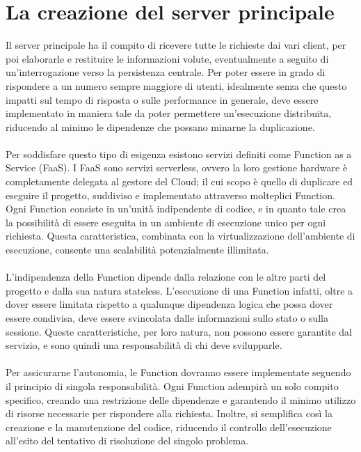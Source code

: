 \section{La creazione del server principale}

Il server principale ha il compito di ricevere tutte le richieste dai vari client,
per poi elaborarle e restituire le informazioni volute,
eventualmente a seguito di un'interrogazione verso la persistenza centrale.
Per poter essere in grado di rispondere a un numero sempre maggiore di utenti,
idealmente senza che questo impatti sul tempo di risposta o sulle performance in generale,
deve essere implementato in maniera tale da poter permettere un'esecuzione distribuita,
riducendo al minimo le dipendenze che possano minarne la duplicazione.\\
\\
Per soddisfare questo tipo di esigenza
esistono servizi definiti come Function as a Service (FaaS).
I FaaS sono servizi serverless,
ovvero la loro gestione hardware è completamente delegata al gestore del Cloud;
il cui scopo è quello di duplicare ed eseguire il progetto,
suddiviso e implementato attraverso molteplici Function.
Ogni Function consiste in un'unità indipendente di codice,
e in quanto tale crea la possibilità di essere eseguita in un ambiente di esecuzione unico per ogni richiesta.
Questa caratteristica, combinata con la virtualizzazione dell’ambiente di esecuzione,
consente una scalabilità potenzialmente illimitata.\\
\\
L’indipendenza della Function dipende dalla relazione con le altre parti del progetto e
dalla sua natura stateless.
L'esecuzione di una Function infatti,
oltre a dover essere limitata rispetto a qualunque dipendenza logica che possa dover essere condivisa,
deve essere svincolata dalle informazioni sullo stato o sulla sessione.
Queste caratteristiche, per loro natura, non possono essere garantite dal servizio,
e sono quindi una responsabilità di chi deve svilupparle.\\
\\
Per assicurarne l'autonomia,
le Function dovranno essere implementate seguendo il principio di singola responsabilità.
Ogni Function adempirà un solo compito specifico,
creando una restrizione delle dipendenze e
garantendo il minimo utilizzo di risorse necessarie per rispondere alla richiesta.
Inoltre, si semplifica così la creazione e la manutenzione del codice,
riducendo il controllo dell'esecuzione all'esito del tentativo di risoluzione del singolo problema.
\clearpage
